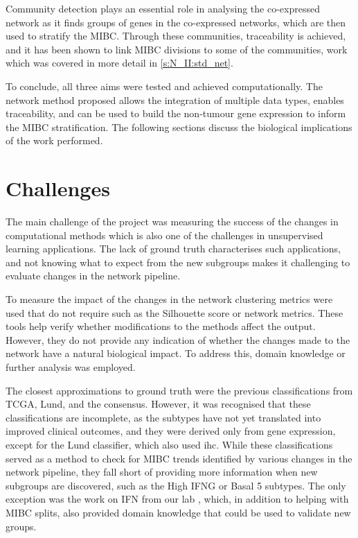 Community detection plays an essential role in analysing the co-expressed network as it finds groups of genes in the co-expressed networks, which are then used to stratify the MIBC. Through these communities, traceability is achieved, and it has been shown to link MIBC divisions to some of the communities, work which was covered in more detail in \cref{s:N_II:std_net}.

% 
To conclude, all three aims were tested and achieved computationally. The network method proposed allows the integration of multiple data types, enables traceability, and can be used to build the non-tumour gene expression to inform the MIBC stratification. The following sections discuss the biological implications of the work performed.

\section{Challenges}

The main challenge of the project was measuring the success of the changes in computational methods which is also one of the challenges in unsupervised learning applications. The lack of ground truth characterises such applications, and not knowing what to expect from the new subgroups makes it challenging to evaluate changes in the network pipeline.

To measure the impact of the changes in the network clustering metrics were used that do not require such as the Silhouette score or network metrics. These tools help verify whether modifications to the methods affect the output. However, they do not provide any indication of whether the changes made to the network have a natural biological impact. To address this, domain knowledge or further analysis was employed.

The closest approximations to ground truth were the previous classifications from TCGA, Lund, and the consensus. However, it was recognised that these classifications are incomplete, as the subtypes have not yet translated into improved clinical outcomes, and they were derived only from gene expression, except for the Lund classifier, which also used \acrlong{ihc}. While these classifications served as a method to check for MIBC trends identified by various changes in the network pipeline, they fall short of providing more information when new subgroups are discovered, such as the High IFNG or Basal 5 subtypes. The only exception was the work on \gls{IFN} from our lab \citep{Baker2022-bj}, which, in addition to helping with MIBC splits, also provided domain knowledge that could be used to validate new groups.

